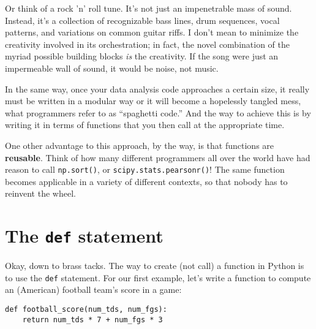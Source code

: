 
Or think of a rock 'n' roll tune. It's not just an impenetrable mass of sound.
Instead, it's a collection of recognizable bass lines, drum sequences, vocal
patterns, and variations on common guitar riffs. I don't mean to minimize the
creativity involved in its orchestration; in fact, the novel combination of the
myriad possible building blocks \textit{is} the creativity. If the song were
just an impermeable wall of sound, it would be noise, not music.



In the same way, once your data analysis code approaches a certain size, it
really must be written in a modular way or it will become a hopelessly tangled
mess, what programmers refer to as ``spaghetti code.'' And the way to achieve
this is by writing it in terms of functions that you then call at the
appropriate time.


One other advantage to this approach, by the way, is that functions are
\textbf{reusable}. Think of how many different programmers all over the world
have had reason to call \texttt{np.sort()}, or \texttt{scipy.stats.pearsonr()}!
The same function becomes applicable in a variety of different contexts, so
that nobody has to reinvent the wheel.

\section{The \texttt{def} statement}


Okay, down to brass tacks. The way to create (not call) a function in Python is
to use the \texttt{def} statement. For our first example, let's write a
function to compute an (American) football team's score in a game:


\begin{Verbatim}[fontsize=\small,samepage=true,frame=single,framesep=3mm]
def football_score(num_tds, num_fgs):
    return num_tds * 7 + num_fgs * 3
\end{Verbatim}

